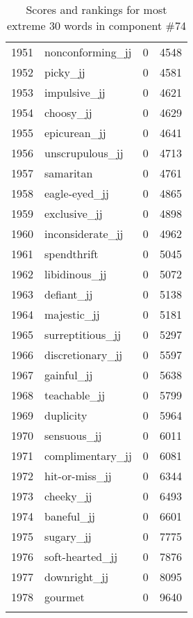 \begin{longtable}[!htbp]{| rlr@{.}l |}
    1951 & nonconforming\_jj & 0 & 4548 \\
    1952 & picky\_jj & 0 & 4581 \\
    1953 & impulsive\_jj & 0 & 4621 \\
    1954 & choosy\_jj & 0 & 4629 \\
    1955 & epicurean\_jj & 0 & 4641 \\
    1956 & unscrupulous\_jj & 0 & 4713 \\
    1957 & samaritan & 0 & 4761 \\
    1958 & eagle-eyed\_jj & 0 & 4865 \\
    1959 & exclusive\_jj & 0 & 4898 \\
    1960 & inconsiderate\_jj & 0 & 4962 \\
    1961 & spendthrift & 0 & 5045 \\
    1962 & libidinous\_jj & 0 & 5072 \\
    1963 & defiant\_jj & 0 & 5138 \\
    1964 & majestic\_jj & 0 & 5181 \\
    1965 & surreptitious\_jj & 0 & 5297 \\
    1966 & discretionary\_jj & 0 & 5597 \\
    1967 & gainful\_jj & 0 & 5638 \\
    1968 & teachable\_jj & 0 & 5799 \\
    1969 & duplicity & 0 & 5964 \\
    1970 & sensuous\_jj & 0 & 6011 \\
    1971 & complimentary\_jj & 0 & 6081 \\
    1972 & hit-or-miss\_jj & 0 & 6344 \\
    1973 & cheeky\_jj & 0 & 6493 \\
    1974 & baneful\_jj & 0 & 6601 \\
    1975 & sugary\_jj & 0 & 7775 \\
    1976 & soft-hearted\_jj & 0 & 7876 \\
    1977 & downright\_jj & 0 & 8095 \\
    1978 & gourmet & 0 & 9640 \\
    \hline
    \caption{Scores and rankings for most extreme 30 words in component \#74} \\
\end{longtable}
